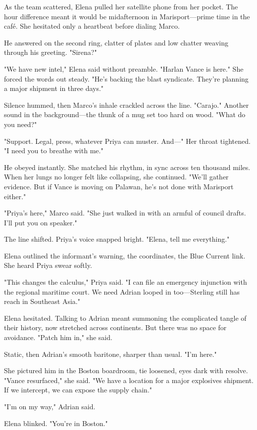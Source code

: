 As the team scattered, Elena pulled her satellite phone from her pocket. The hour difference meant it would be midafternoon in Marisport—prime time in the café. She hesitated only a heartbeat before dialing Marco.

He answered on the second ring, clatter of plates and low chatter weaving through his greeting. "Sirena?"

"We have new intel," Elena said without preamble. "Harlan Vance is here." She forced the words out steady. "He's backing the blast syndicate. They're planning a major shipment in three days."

Silence hummed, then Marco's inhale crackled across the line. "Carajo." Another sound in the background—the thunk of a mug set too hard on wood. "What do you need?"

"Support. Legal, press, whatever Priya can muster. And—" Her throat tightened. "I need you to breathe with me."

He obeyed instantly. She matched his rhythm, in sync across ten thousand miles. When her lungs no longer felt like collapsing, she continued. "We'll gather evidence. But if Vance is moving on Palawan, he's not done with Marisport either."

"Priya's here," Marco said. "She just walked in with an armful of council drafts. I'll put you on speaker."

The line shifted. Priya's voice snapped bright. "Elena, tell me everything."

Elena outlined the informant's warning, the coordinates, the Blue Current link. She heard Priya swear softly.

"This changes the calculus," Priya said. "I can file an emergency injunction with the regional maritime court. We need Adrian looped in too—Sterling still has reach in Southeast Asia."

Elena hesitated. Talking to Adrian meant summoning the complicated tangle of their history, now stretched across continents. But there was no space for avoidance. "Patch him in," she said.

Static, then Adrian's smooth baritone, sharper than usual. "I'm here."

She pictured him in the Boston boardroom, tie loosened, eyes dark with resolve. "Vance resurfaced," she said. "We have a location for a major explosives shipment. If we intercept, we can expose the supply chain."

"I'm on my way," Adrian said.

Elena blinked. "You're in Boston."

